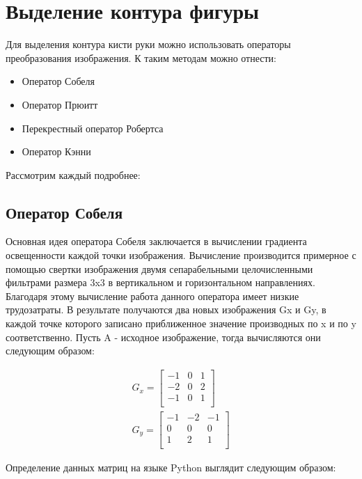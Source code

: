 \section{Выделение контура фигуры}
\label{sec:Edge}

Для выделения контура кисти руки можно использовать операторы преобразования изображения. К таким методам можно отнести:

\begin{itemize}
	\item Оператор Собеля
	\item Оператор Прюитт
	\item Перекрестный оператор Робертса
	\item Оператор Кэнни
\end{itemize}

Рассмотрим каждый подробнее:

\subsection{Оператор Собеля}

Основная идея оператора Собеля\cite{Sobel} заключается в вычислении градиента освещенности каждой точки изображения. Вычисление производится примерное с помощью свертки изображения двумя сепарабельными целочисленными фильтрами размера 3x3 в вертикальном и горизонтальном направлениях. Благодаря этому вычисление работа данного оператора имеет низкие трудозатраты. В результате получаются два новых изображения Gx и Gy, в каждой точке которого записано приближенное значение производных по x и по y соответственно. Пусть A - исходное изображение, тогда вычисляются они следующим образом:

\begin{eqnarray}\label{eq:sobel-matrixs}
G_x = \begin{bmatrix}
-1 & 0 & 1\\
-2 & 0 & 2\\
-1 & 0 & 1\\
\end{bmatrix} \\
G_y = \begin{bmatrix}
-1 & -2 & -1\\
0 & 0 & 0\\
1 & 2 & 1\\
\end{bmatrix}
\end{eqnarray}

Определение данных матриц на языке Python выглядит следующим образом:

